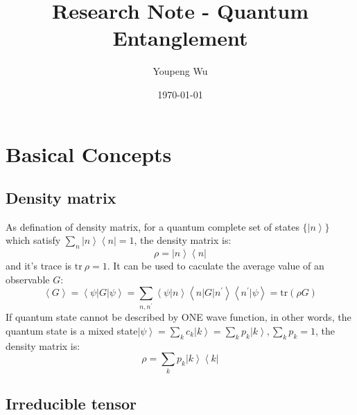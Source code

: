 \documentclass{article}
\newcommand{\ket}[1]{\left|#1\right\rangle}
\newcommand{\bra}[1]{\left\langle#1\right|}
\newcommand{\braket}[1]{\left\langle#1\right\rangle}
\begin{document}
\title{Research Note - Quantum Entanglement}
\author{Youpeng Wu}
\date{\today}
\maketitle

\section{Basical Concepts }
\subsection{Density matrix}
As defination of density matrix, for a quantum complete set of states \(\{\ket{n}\}\) which satisfy \(\sum_n \ket{n}\bra{n}=1\), the density matrix is:
\[\rho=\ket{n}\bra{n}\]
and it's trace is \(\mathrm{tr}\ \rho=1\). It can be used to caculate the average value of an observable \(G\): 
\[\braket{G}=\braket{\psi|G|\psi}=\sum_{n,n^\prime}\braket{\psi|n}\braket{n|G|n^\prime}\braket{n^\prime|\psi}=\mathrm{tr}(\rho G)\]
If quantum state cannot be described by ONE wave function, in other words, the quantum state is a mixed state\(\ket{\psi}=\sum_k c_k\ket{k}=\sum_kp_k\ket{k},\sum_k p_k=1\), the density matrix is:
\[\rho=\sum_k p_k\ket{k}\bra{k}\]

\subsection{Irreducible tensor}
\end{document}
